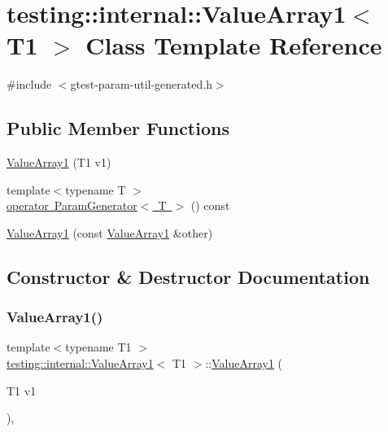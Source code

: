 \hypertarget{classtesting_1_1internal_1_1ValueArray1}{}\section{testing\+::internal\+::Value\+Array1$<$ T1 $>$ Class Template Reference}
\label{classtesting_1_1internal_1_1ValueArray1}


{\ttfamily \#include $<$gtest-\/param-\/util-\/generated.\+h$>$}

\subsection*{Public Member Functions}
\begin{DoxyCompactItemize}
\item 
\mbox{\hyperlink{classtesting_1_1internal_1_1ValueArray1_a8eaffed25a4ddbe790472ca07595a319}{Value\+Array1}} (T1 v1)
\item 
{\footnotesize template$<$typename T $>$ }\\\mbox{\hyperlink{classtesting_1_1internal_1_1ValueArray1_a1ffe0a28fd09efa980df1aaa3f7af2a0}{operator Param\+Generator$<$ T $>$}} () const
\item 
\mbox{\hyperlink{classtesting_1_1internal_1_1ValueArray1_a54a3968da3354334cb4d730f5254e216}{Value\+Array1}} (const \mbox{\hyperlink{classtesting_1_1internal_1_1ValueArray1}{Value\+Array1}} \&other)
\end{DoxyCompactItemize}


\subsection{Constructor \& Destructor Documentation}
\mbox{\label{classtesting_1_1internal_1_1ValueArray1_a8eaffed25a4ddbe790472ca07595a319}} 
\subsubsection{\texorpdfstring{ValueArray1()}{ValueArray1()}\hspace{0.1cm}{\footnotesize\ttfamily [1/2]}}
{\footnotesize\ttfamily template$<$typename T1 $>$ \\
\mbox{\hyperlink{classtesting_1_1internal_1_1ValueArray1}{testing\+::internal\+::\+Value\+Array1}}$<$ T1 $>$\+::\mbox{\hyperlink{classtesting_1_1internal_1_1ValueArray1}{Value\+Array1}} (\begin{DoxyParamCaption}\item[{T1}]{v1 }\end{DoxyParamCaption})\hspace{0.3cm}{\ttfamily [inline]}, {\ttfamily [explicit]}}


